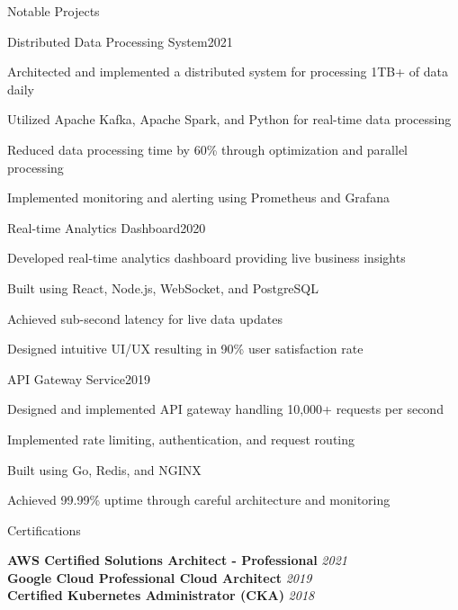 \documentclass{resume} %
\begin{document}
\begin{rSection}{Notable Projects}

\begin{rSubsection}{Distributed Data Processing System}{2021}{}{}
\item Architected and implemented a distributed system for processing 1TB+ of data daily
\item Utilized Apache Kafka, Apache Spark, and Python for real-time data processing
\item Reduced data processing time by 60\% through optimization and parallel processing
\item Implemented monitoring and alerting using Prometheus and Grafana
\end{rSubsection}


\begin{rSubsection}{Real-time Analytics Dashboard}{2020}{}{}
\item Developed real-time analytics dashboard providing live business insights
\item Built using React, Node.js, WebSocket, and PostgreSQL
\item Achieved sub-second latency for live data updates
\item Designed intuitive UI/UX resulting in 90\% user satisfaction rate
\end{rSubsection}


\begin{rSubsection}{API Gateway Service}{2019}{}{}
\item Designed and implemented API gateway handling 10,000+ requests per second
\item Implemented rate limiting, authentication, and request routing
\item Built using Go, Redis, and NGINX
\item Achieved 99.99\% uptime through careful architecture and monitoring
\end{rSubsection}

\end{rSection}


\begin{rSection}{Certifications}

{\bf AWS Certified Solutions Architect - Professional} \hfill {\em 2021} \\
{\bf Google Cloud Professional Cloud Architect} \hfill {\em 2019} \\
{\bf Certified Kubernetes Administrator (CKA)} \hfill {\em 2018}

\end{rSection}
\end{document}
